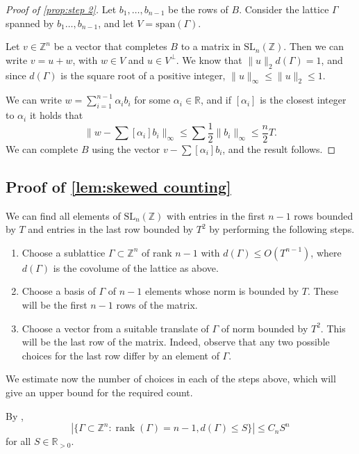 \documentclass[12pt, a4paper]{amsart}
\numberwithin{equation}{section}
\theoremstyle{definition}
\newcommand{\R}{\mathbb{R}}
\newcommand{\Z}{\mathbb{Z}}
\newcommand{\SL}{\mathrm{SL}}
\newcommand{\spann}{\mathrm{span}}
\begin{document}
\begin{proof}[Proof of \cref{prop:step 2}]
Let $b_{1},\ldots,b_{n-1}$ be the rows of $B$. Consider the lattice
$\Gamma$ spanned by $b_{1}\ldots,b_{n-1}$, and let $V=\spann(\Gamma)$.


Let $v\in \Z^n$ be a vector that completes $B$ to a matrix in $\SL_{n}(\Z)$. 
Then we can write $v=u+w$, with $w\in V$ and $u\in V^{\perp}$. 
We know that $\|u\|_2d(\Gamma)=1$, and since $d(\Gamma)$
is the square root of a positive integer, $\|u\|_\infty \le\|u\|_2\le1$.

We can write $w=\sum_{i=1}^{n-1}\alpha_{i}b_{i}$ for some $\alpha_i\in\R$,
and if $[\alpha_{i}]$
is the closest integer to $\alpha_{i}$ it holds that
\[
\|w-\sum[\alpha_{i}]b_{i}\|_{\infty}\le\sum\frac{1}{2}\|b_{i}\|_{\infty}\le\frac{n}{2}T.
\]
We can complete $B$ using the vector $v-\sum[\alpha_{i}]b_{i}$,
and the result follows.
\end{proof}


\subsection{Proof of \texorpdfstring{\cref{lem:skewed counting}}{Lemma 1.6}}
\label{sec:skewed counting}

We can find all elements of $\SL_n(\Z)$ with entries in the first $n-1$ rows
bounded by $T$ and entries in the last row bounded by $T^2$
by performing the following steps.

\begin{enumerate}
\item Choose a sublattice $\Gamma \subset \Z^n$ of rank $n-1$ with $d(\Gamma)\le O(T^{n-1})$, where $d(\Gamma)$ is the covolume of the lattice as above.
\item Choose a basis of $\Gamma$ of $n-1$ elements whose norm is bounded by $T$.
These will be the first $n-1$ rows of the matrix.
\item Choose a vector from a suitable translate of $\Gamma$ of norm bounded by $T^2$.
This will be the last row of the matrix.
Indeed, observe that any two possible choices for the last row differ by an element
of $\Gamma$.
\end{enumerate}

We estimate now the number of choices in each of the steps above, which will give
an upper bound for the required count.

By \cite[Theorem~2]{schmidt1968asymptotic},
\[
|\{\Gamma \subset \Z^n : \operatorname{rank} (\Gamma) = n-1, d(\Gamma) \le S\}| \le C_n S^n
\]
for all $S\in\R_{>0}$.
\end{document}
